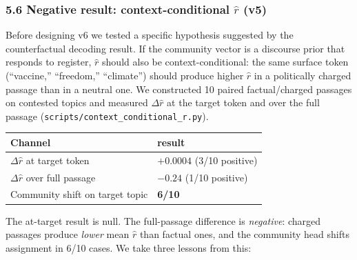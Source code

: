 \documentclass[
  11pt]{article}
\newcounter{none} %
\begin{document}
\subsubsection{\texorpdfstring{5.6 Negative result: context-conditional
\(\hat{r}\)
(v5)}{5.6 Negative result: context-conditional \textbackslash hat\{r\} (v5)}}\label{negative-result-context-conditional-hatr-v5}

Before designing v6 we tested a specific hypothesis suggested by the
counterfactual decoding result. If the community vector is a discourse
prior that responds to register, \(\hat{r}\) should also be
context-conditional: the same surface token (``vaccine,'' ``freedom,''
``climate'') should produce higher \(\hat{r}\) in a politically charged
passage than in a neutral one. We constructed 10 paired factual/charged
passages on contested topics and measured \(\Delta \hat{r}\) at the
target token and over the full passage
(\texttt{scripts/context\_conditional\_r.py}).

{\def\LTcaptype{none} %
\begin{longtable}[]{@{}
  >{\raggedright\arraybackslash}p{}
  >{\raggedright\arraybackslash}p{}@{}}
\toprule\noalign{}
\begin{minipage}[b]{\linewidth}\raggedright
Channel
\end{minipage} & \begin{minipage}[b]{\linewidth}\raggedright
result
\end{minipage} \\
\midrule\noalign{}
\endhead
\bottomrule\noalign{}
\endlastfoot
\(\Delta \hat{r}\) at target token & \(+0.0004\) (3/10 positive) \\
\(\Delta \hat{r}\) over full passage & \(\mathbf{-0.24}\) (1/10
positive) \\
Community shift on target topic & \textbf{6/10} \\
\end{longtable}
}

The at-target result is null. The full-passage difference is
\emph{negative}: charged passages produce \emph{lower} mean \(\hat{r}\)
than factual ones, and the community head shifts assignment in 6/10
cases. We take three lessons from this:
\end{document}
